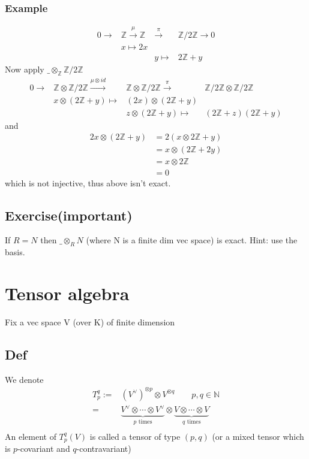 \documentclass{book}
\begin{document}
\subsection{Example}
$$
\begin{aligned}
    0\rightarrow &\mathbb{Z}\stackrel{\mu}\rightarrow \mathbb{Z}&\stackrel{\pi}\rightarrow &\mathbb{Z}/2\mathbb{Z}\rightarrow0\\
    &x\mapsto 2x& &\\
    & &y \mapsto &2\mathbb{Z}+y
\end{aligned}
$$
Now apply $\_\otimes_\mathbb{Z}\mathbb{Z}/2\mathbb{Z}$
$$
\begin{aligned}
    0\rightarrow &\mathbb{Z}\otimes\mathbb{Z}/2\mathbb{Z}\stackrel{\mu\otimes id}\rightarrow &\mathbb{Z}\otimes\mathbb{Z}/2\mathbb{Z}\stackrel{\pi}\rightarrow &\mathbb{Z}/2\mathbb{Z}\otimes\mathbb{Z}/2\mathbb{Z}\\
    & x\otimes(2\mathbb{Z}+y)\mapsto &(2x)\otimes(2\mathbb{Z}+y) & \\
    & &z\otimes(2\mathbb{Z}+y)\mapsto &(2\mathbb{Z}+z)(2\mathbb{Z}+y)
\end{aligned}
$$
and 
$$
\begin{aligned}
    2x\otimes(2\mathbb{Z}+y) &=2(x\otimes 2\mathbb{Z}+y)\\
    &=x\otimes(2\mathbb{Z}+2y)\\
    &=x\otimes 2\mathbb{Z}\\
    &=0
\end{aligned}
$$
which is not injective, thus above isn't exact.
\section{Exercise(important)}
If $R=N$ then $\_\otimes_RN$ (where N is a finite dim vec space) is exact. Hint: use the basis.
\chapter{Tensor algebra}
Fix a vec space V (over K) of finite dimension
\section{Def}
We denote
$$
\begin{aligned}
    T_p^q:=&(V^\vee)^{\otimes p}\otimes V^{\otimes q}\qquad p,q\in \mathbb{N}\\
    =&\underbrace{V^\vee\otimes\cdots\otimes V^\vee}\limits_{p\text{ times}}\otimes \underbrace{V\otimes\cdots\otimes V}\limits_{q\text{ times}}\\
\end{aligned}
$$
An element of $T_p^q(V)$ is called a tensor of type $(p,q)$ (or a mixed tensor which is $p$-covariant and $q$-contravariant)
\end{document}
